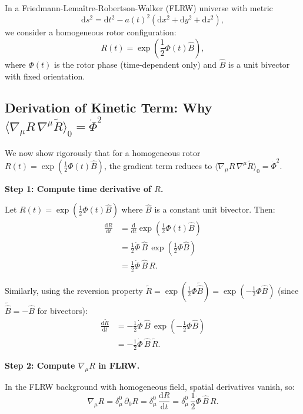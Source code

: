 \documentclass[11pt,a4paper]{article}
\numberwithin{equation}{section}
\theoremstyle{plain}
\theoremstyle{definition}
\theoremstyle{remark}
\newcommand{\dd}{\mathrm{d}}
\begin{document}
In a Friedmann-Lemaître-Robertson-Walker (FLRW) universe with metric
\begin{equation}
\dd s^2 = \dd t^2 - a(t)^2\left(\dd x^2 + \dd y^2 + \dd z^2\right),
\end{equation}
we consider a homogeneous rotor configuration:
\begin{equation}
R(t) = \exp\left(\frac{1}{2}\Phi(t)\hat{B}\right),
\end{equation}
where $\Phi(t)$ is the rotor phase (time-dependent only) and $\hat{B}$ is a unit bivector with fixed orientation.

\subsection{Derivation of Kinetic Term: Why $\langle \nabla_\mu R\,\nabla^\mu \widetilde{R} \rangle_0 = \dot{\Phi}^2$}

We now show rigorously that for a homogeneous rotor $R(t) = \exp(\frac{1}{2}\Phi(t)\hat{B})$, the gradient term reduces to $\langle \nabla_\mu R\,\nabla^\mu \widetilde{R} \rangle_0 = \dot{\Phi}^2$.

\textbf{Step 1: Compute time derivative of $R$.}

Let $R(t) = \exp(\frac{1}{2}\Phi(t)\hat{B})$ where $\hat{B}$ is a constant unit bivector. Then:
\begin{align}
\frac{\dd R}{\dd t} &= \frac{\dd}{\dd t}\exp\left(\frac{1}{2}\Phi(t)\hat{B}\right)\\
&= \frac{1}{2}\dot{\Phi}\,\hat{B}\,\exp\left(\frac{1}{2}\Phi\hat{B}\right)\\
&= \frac{1}{2}\dot{\Phi}\,\hat{B}\,R.
\end{align}

Similarly, using the reversion property $\widetilde{R} = \exp(\frac{1}{2}\Phi\widetilde{\hat{B}}) = \exp(-\frac{1}{2}\Phi\hat{B})$ (since $\widetilde{\hat{B}} = -\hat{B}$ for bivectors):
\begin{align}
\frac{\dd \widetilde{R}}{\dd t} &= -\frac{1}{2}\dot{\Phi}\,\hat{B}\,\exp\left(-\frac{1}{2}\Phi\hat{B}\right)\\
&= -\frac{1}{2}\dot{\Phi}\,\hat{B}\,\widetilde{R}.
\end{align}

\textbf{Step 2: Compute $\nabla_\mu R$ in FLRW.}

In the FLRW background with homogeneous field, spatial derivatives vanish, so:
\begin{equation}
\nabla_\mu R = \delta_\mu^0\,\partial_0 R = \delta_\mu^0\,\frac{\dd R}{\dd t} = \delta_\mu^0\,\frac{1}{2}\dot{\Phi}\,\hat{B}\,R.
\end{equation}
\end{document}
